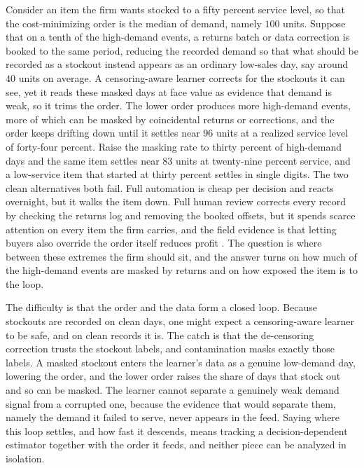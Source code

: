 \documentclass[11pt]{article}
\theoremstyle{plain}
\begin{document}
Consider an item the firm wants stocked to a fifty percent service level, so that
the cost-minimizing order is the median of demand, namely $100$ units. Suppose
that on a tenth of the high-demand events, a returns batch or data correction is
booked to the same period, reducing the recorded demand so that what should be
recorded as a stockout instead appears as an ordinary low-sales day, say around
$40$ units on average. A censoring-aware learner corrects for the stockouts it can
see, yet it reads these masked days at face value as evidence that demand is weak,
so it trims the order. The lower order produces more high-demand events, more of
which can be masked by coincidental returns or corrections, and the order keeps
drifting down until it settles near $96$ units at a realized service level of
forty-four percent. Raise the masking rate to thirty percent of high-demand days
and the same item settles near $83$ units at twenty-nine percent service, and a
low-service item that started at thirty percent settles in single digits. The two
clean alternatives both fail. Full automation is cheap per decision and reacts
overnight, but it walks the item down. Full human review corrects every record by
checking the returns log and removing the booked offsets, but it spends scarce
attention on every item the firm carries, and the field evidence is that letting
buyers also override the order itself reduces profit \citep{kesavan2020override}.
The question is where between these extremes the firm should sit, and the answer
turns on how much of the high-demand events are masked by returns and on how
exposed the item is to the loop.

The difficulty is that the order and the data form a closed loop. Because
stockouts are recorded on clean days, one might expect a censoring-aware learner
to be safe, and on clean records it is. The catch is that the de-censoring
correction trusts the stockout labels, and contamination masks exactly those
labels. A masked stockout enters the learner's data as a genuine low-demand day,
lowering the order, and the lower order raises the share of days that stock out
and so can be masked. The learner cannot separate a genuinely weak demand signal
from a corrupted one, because the evidence that would separate them, namely the
demand it failed to serve, never appears in the feed. Saying where this loop
settles, and how fast it descends, means tracking a decision-dependent estimator
together with the order it feeds, and neither piece can be analyzed in isolation.
\end{document}

